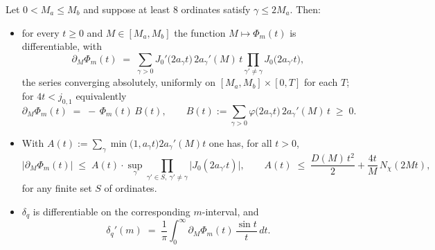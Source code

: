 \begin{lemma}\label{lem:diffint}
Let $0<M_a\le M_b$ and suppose at least $8$ ordinates satisfy
$\gamma\le2M_a$. Then:
\begin{itemize}
\item[(a)] for every $t\ge0$ and $M\in[M_a,M_b]$ the function
$M\mapsto\Phi_m(t)$ is differentiable, with
\begin{equation}\label{eq:dPhi}
\partial_M\Phi_m(t)\;=\;\sum_{\gamma>0}
J_0'\bigl(2a_\gamma t\bigr)\,2a_\gamma'(M)\,t
\prod_{\gamma'\ne\gamma}J_0\bigl(2a_{\gamma'}t\bigr),
\end{equation}
the series converging absolutely, uniformly on
$[M_a,M_b]\times[0,T]$ for each $T$; for $4t<j_{0,1}$ equivalently
\begin{equation}\label{eq:dPhiLog}
\partial_M\Phi_m(t)\;=\;-\,\Phi_m(t)\,B(t),
\qquad
B(t):=\sum_{\gamma>0}\varphi\bigl(2a_\gamma t\bigr)\,2a_\gamma'(M)\,t
\;\ge\;0 .
\end{equation}
\item[(b)] With
$A(t):=\sum_\gamma\min\bigl(1,a_\gamma t\bigr)2a_\gamma'(M)t$ one has,
for all $t>0$,
\begin{equation}\label{eq:Abound}
|\partial_M\Phi_m(t)|\;\le\;A(t)\cdot
\sup_{\gamma}\prod_{\gamma'\in S,\ \gamma'\ne\gamma}
\bigl|J_0(2a_{\gamma'}t)\bigr|,
\qquad
A(t)\;\le\;\frac{D(M)\,t^2}{2}+\frac{4t}{M}\,N_\chi(2Mt),
\end{equation}
for any finite set $S$ of ordinates.
\item[(c)] $\delta_q$ is differentiable on the corresponding
$m$-interval, and
\[
\delta_q'(m)\;=\;\frac1\pi\int_0^\infty
\partial_M\Phi_m(t)\,\frac{\sin t}{t}\,dt .
\]
\end{itemize}
\end{lemma}

